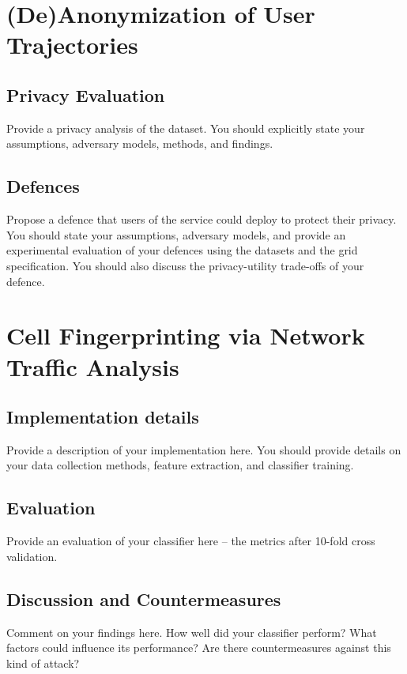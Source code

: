 \documentclass[10pt,conference,compsocconf]{IEEEtran}
\begin{document}
\section{(De)Anonymization of User Trajectories}

\subsection{Privacy Evaluation}
Provide a privacy analysis of the dataset. You should explicitly state your assumptions, adversary
models, methods, and findings.

\subsection{Defences}
Propose a defence that users of the service could deploy to protect their privacy.  You
should state your assumptions, adversary models, and provide an experimental evaluation of your
defences using the datasets and the grid specification. You should also discuss the
privacy-utility trade-offs of your defence.

\section{Cell Fingerprinting via Network Traffic Analysis}

\subsection{Implementation details}
Provide a description of your implementation here. You should provide details on your data collection methods, feature extraction, and classifier training.

\subsection{Evaluation}
Provide an evaluation of your classifier here -- the metrics after 10-fold cross validation.

\subsection{Discussion and Countermeasures}
Comment on your findings here. How well did your classifier perform? What factors could influence its performance? Are there countermeasures against this kind of attack?



\end{document}
